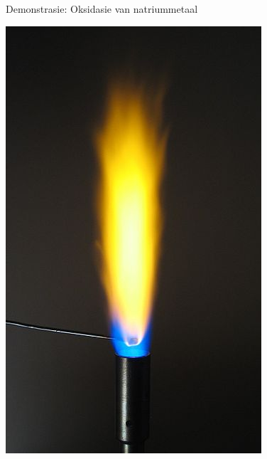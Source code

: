 {{\begin{g_experiment}{Demonstrasie: Oksidasie van natriummetaal}
\begin{minipage}{.4\textwidth}
 \begin{center}
  \includegraphics[width=.5\textwidth]{photos/sodium_flame_soren_wedel_nielsen_wikipedia.jpg}
 \end{center}

\end{minipage}


\end{g_experiment}}}
